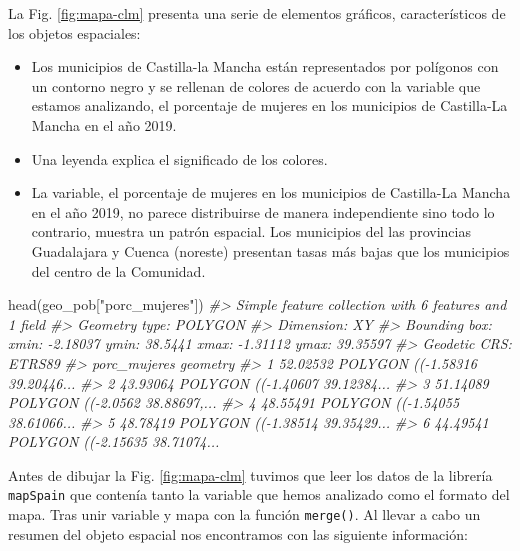 \documentclass[
]{report}
\newenvironment{Shaded}{\begin{snugshade}}{\end{snugshade}}
\newcommand{\CommentTok}[1]{\textcolor[rgb]{0.56,0.35,0.01}{\textit{#1}}}
\newcommand{\FunctionTok}[1]{\textcolor[rgb]{0.00,0.00,0.00}{#1}}
\newcommand{\NormalTok}[1]{#1}
\newcommand{\StringTok}[1]{\textcolor[rgb]{0.31,0.60,0.02}{#1}}
\begin{document}
La Fig. \ref{fig:mapa-clm} presenta una serie de elementos gráficos,
característicos de los objetos espaciales:

\begin{itemize}
\item
  Los municipios de Castilla-la Mancha están representados por polígonos con
  un contorno negro y se rellenan de colores de acuerdo con la variable que
  estamos analizando, el porcentaje de mujeres en los municipios de
  Castilla-La Mancha en el año 2019.
\item
  Una leyenda explica el significado de los colores.
\item
  La variable, el porcentaje de mujeres en los municipios de Castilla-La
  Mancha en el año 2019, no parece distribuirse de manera independiente sino
  todo lo contrario, muestra un patrón espacial. Los municipios del las
  provincias Guadalajara y Cuenca (noreste) presentan tasas más bajas que los
  municipios del centro de la Comunidad.
\end{itemize}

\begin{Shaded}
\begin{Highlighting}[]
\FunctionTok{head}\NormalTok{(geo\_pob[}\StringTok{"porc\_mujeres"}\NormalTok{])}
\CommentTok{\#\textgreater{} Simple feature collection with 6 features and 1 field}
\CommentTok{\#\textgreater{} Geometry type: POLYGON}
\CommentTok{\#\textgreater{} Dimension:     XY}
\CommentTok{\#\textgreater{} Bounding box:  xmin: {-}2.18037 ymin: 38.5441 xmax: {-}1.31112 ymax: 39.35597}
\CommentTok{\#\textgreater{} Geodetic CRS:  ETRS89}
\CommentTok{\#\textgreater{}   porc\_mujeres                       geometry}
\CommentTok{\#\textgreater{} 1     52.02532 POLYGON (({-}1.58316 39.20446...}
\CommentTok{\#\textgreater{} 2     43.93064 POLYGON (({-}1.40607 39.12384...}
\CommentTok{\#\textgreater{} 3     51.14089 POLYGON (({-}2.0562 38.88697,...}
\CommentTok{\#\textgreater{} 4     48.55491 POLYGON (({-}1.54055 38.61066...}
\CommentTok{\#\textgreater{} 5     48.78419 POLYGON (({-}1.38514 39.35429...}
\CommentTok{\#\textgreater{} 6     44.49541 POLYGON (({-}2.15635 38.71074...}
\end{Highlighting}
\end{Shaded}

Antes de dibujar la Fig. \ref{fig:mapa-clm} tuvimos que leer los datos de la
librería \texttt{mapSpain} \citep{rmapspain} que contenía tanto la variable que hemos
analizado como el formato del mapa. Tras unir variable y mapa con la función
\texttt{merge()}. Al llevar a cabo un resumen del objeto espacial nos encontramos con
las siguiente información:
\end{document}
